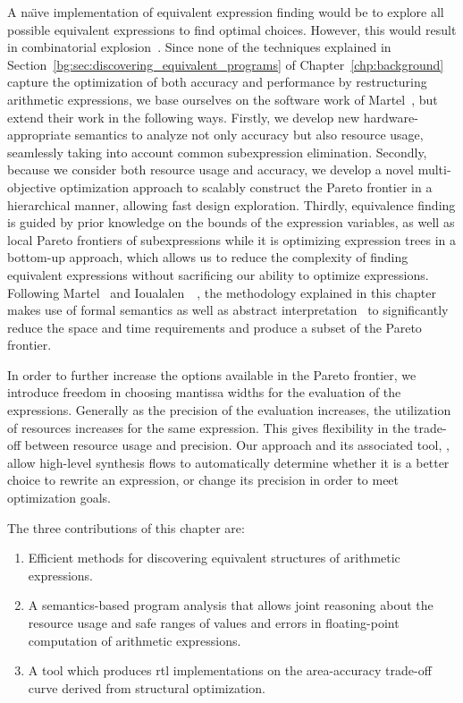 A na{\"\i}ve implementation of equivalent expression finding
would be to explore all possible equivalent expressions to find
optimal choices.  However, this would result in combinatorial
explosion~\cite{ioualalen}.  Since none of the techniques explained
in Section~\ref{bg:sec:discovering_equivalent_programs} of
Chapter~\ref{chp:background} capture the optimization of both accuracy and
performance by restructuring arithmetic expressions, we base ourselves on the
software work of Martel~\cite{martel07}, but extend their work in the following
ways. Firstly, we develop new hardware-appropriate semantics to analyze not
only accuracy but also resource usage, seamlessly taking into account common
subexpression elimination. Secondly, because we consider both resource usage
and accuracy, we develop a novel multi-objective optimization approach to
scalably construct the Pareto frontier in a hierarchical manner, allowing fast
design exploration. Thirdly, equivalence finding is guided by prior knowledge
on the bounds of the expression variables, as well as local Pareto frontiers
of subexpressions while it is optimizing expression trees in a bottom-up
approach, which allows us to reduce the complexity of finding equivalent
expressions without sacrificing our ability to optimize expressions.  Following
Martel~\cite{martel07} and Ioualalen~\etal~\cite{ioualalen}, the methodology
explained in this chapter makes use of formal semantics as well as abstract
interpretation~\cite{cousot77} to significantly reduce the space and time
requirements and produce a subset of the Pareto frontier.

In order to further increase the options available in the Pareto frontier,
we introduce freedom in choosing mantissa widths for the evaluation of the
expressions. Generally as the precision of the evaluation increases, the
utilization of resources increases for the same expression. This gives
flexibility in the trade-off between resource usage and precision. Our
approach and its associated tool, \soap, allow high-level synthesis flows to
automatically determine whether it is a better choice to rewrite an expression,
or change its precision in order to meet optimization goals.

The three contributions of this chapter are:
\begin{enumerate}
    \item Efficient methods for discovering equivalent structures of
    arithmetic expressions.
    \item A semantics-based program analysis that allows joint reasoning about
    the resource usage and safe ranges of values and errors in floating-point
    computation of arithmetic expressions.
    \item A tool which produces \gls{rtl} implementations on the area-accuracy
    trade-off curve derived from structural optimization.
\end{enumerate}

